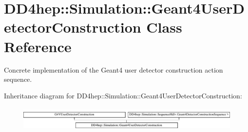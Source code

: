 \hypertarget{class_d_d4hep_1_1_simulation_1_1_geant4_user_detector_construction}{}\section{D\+D4hep\+:\+:Simulation\+:\+:Geant4\+User\+Detector\+Construction Class Reference}
\label{class_d_d4hep_1_1_simulation_1_1_geant4_user_detector_construction}


Concrete implementation of the Geant4 user detector construction action sequence.  


Inheritance diagram for D\+D4hep\+:\+:Simulation\+:\+:Geant4\+User\+Detector\+Construction\+:\begin{figure}[H]
\begin{center}
\leavevmode
\includegraphics[height=1.247216cm]{class_d_d4hep_1_1_simulation_1_1_geant4_user_detector_construction}
\end{center}
\end{figure}
